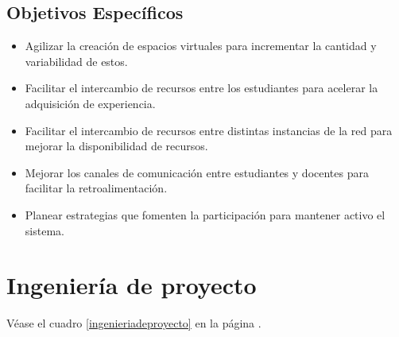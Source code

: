 \documentclass[letterpaper,11pt]{article}
\begin{document}
\subsection{Objetivos Específicos}
\begin{itemize}
\item Agilizar la creación de espacios virtuales para incrementar la cantidad y variabilidad de
estos.
\item Facilitar el intercambio de recursos entre los estudiantes para acelerar la adquisición de
experiencia.
\item Facilitar el intercambio de recursos entre distintas instancias de la red para mejorar la
disponibilidad de recursos.
\item Mejorar los canales de comunicación entre estudiantes y docentes para facilitar la
retroalimentación.
\item Planear estrategias que fomenten la participación para mantener activo el sistema.
\end{itemize}

\section{Ingeniería de proyecto}
Véase el cuadro \ref{ingenieriadeproyecto} en la página \pageref{ingenieriadeproyecto}.
\end{document}

